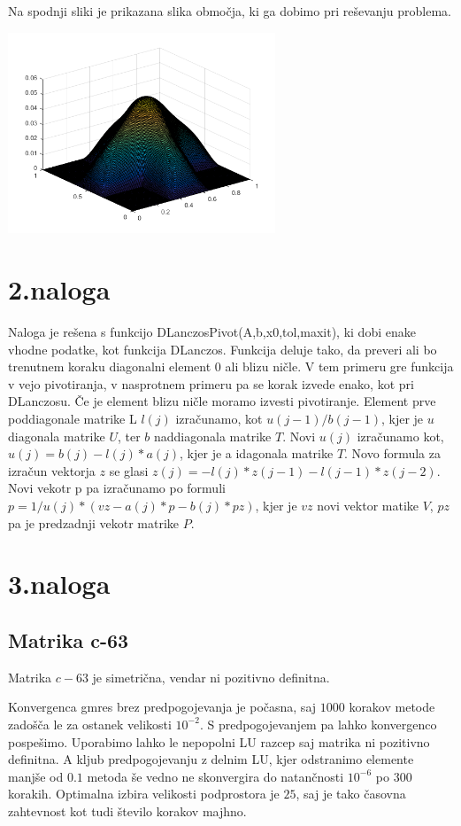\documentclass[11pt]{article} %
\begin{document}
Na spodnji sliki je prikazana slika območja, ki ga dobimo pri reševanju problema.

\includegraphics[width=0.6\textwidth]{slika1}

\section{2.naloga}

Naloga je rešena s funkcijo DLanczosPivot(A,b,x0,tol,maxit), ki dobi enake vhodne podatke, kot funkcija DLanczos. Funkcija deluje tako, da preveri ali bo trenutnem koraku diagonalni element $0$ ali blizu ničle. V tem primeru gre funkcija v vejo pivotiranja, v nasprotnem primeru pa se korak izvede enako, kot pri DLanczosu. Če je element blizu ničle moramo izvesti pivotiranje. Element prve poddiagonale matrike L $l(j)$ izračunamo, kot $u(j-1)/b(j-1)$, kjer je $u$ diagonala matrike $U$, ter $b$ naddiagonala matrike $T$. Novi $u(j)$ izračunamo kot,
$u(j) = b(j) -l(j)*a(j)$, kjer je a idagonala matrike $T$. Novo formula za izračun vektorja $z$ se glasi $z(j) = -l(j)*z(j-1)-l(j-1)*z(j-2)$. Novi vekotr p pa izračunamo po formuli
$p = 1/u(j)*(vz - a(j)*p-b(j)*pz)$, kjer je $vz$ novi vektor matike $V$, $pz$ pa je predzadnji vekotr matrike $P$. 


\section{3.naloga}

\subsection{Matrika c-63}

Matrika $c-63$ je simetrična, vendar ni pozitivno definitna.

 Konvergenca gmres brez predpogojevanja je počasna, saj $1000$ korakov metode zadošča le za ostanek velikosti $10^{-2}$. S predpogojevanjem pa lahko konvergenco pospešimo. Uporabimo lahko le nepopolni LU razcep saj matrika ni pozitivno definitna. A kljub predpogojevanju z delnim LU, kjer odstranimo elemente manjše od $0.1$ metoda še vedno ne skonvergira do natančnosti $10^{-6}$ po $300$ korakih. Optimalna izbira velikosti podprostora je $25$, saj je tako časovna zahtevnost kot tudi število korakov majhno.
\end{document}
